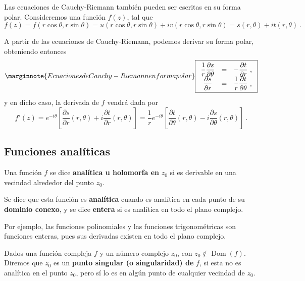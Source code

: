 Las ecuaciones de Cauchy-Riemann también pueden ser escritas en su forma polar. Consideremos una función $f(z)$, tal que
\begin{equation*}
    f(z) = f(r \cos \theta, r \sin \theta) = u(r \cos \theta, r \sin \theta) + i v(r \cos \theta, r \sin \theta) = s(r, \theta) + i t(r, \theta) \ .
\end{equation*}

A partir de las ecuaciones de Cauchy-Riemann, podemos derivar su forma polar, obteniendo entonces
\begingroup
\renewcommand*{\arraystretch}{2}
\begin{equation} \marginnote{Ecuaciones de Cauchy-Riemann en forma polar}
    \boxed{
        \begin{array}{ccc}
            \dfrac{1}{r} \dfrac{\partial s}{\partial \theta} & = & - \dfrac{\partial t}{\partial r} \ , \\
            \dfrac{\partial s}{\partial r} & = & \dfrac{1}{r} \dfrac{\partial t}{\partial \theta} \ , 
        \end{array}
    }
\end{equation}
\endgroup
y en dicho caso, la derivada de $f$ vendrá dada por
\begin{equation}
    f'(z) = e^{-i\theta} \left[ \frac{\partial s}{\partial r}(r, \theta) + i \frac{\partial t}{\partial r}(r, \theta) \right] = \frac{1}{r} e^{-i\theta} \left[ \frac{\partial t}{\partial \theta}(r, \theta) - i \frac{\partial s}{\partial \theta}(r, \theta) \right] \ .
\end{equation}

\subsection{Funciones analíticas}

\begin{defi}
    Una función $f$ se dice \textbf{analítica u holomorfa en} $z_0$ si es derivable en una vecindad alrededor del punto $z_0$. 

    Se dice que esta función es \textbf{analítica} cuando es analítica en cada punto de su \textbf{dominio conexo}, y se dice \textbf{entera} si es analítica en todo el plano complejo.
\end{defi}

Por ejemplo, las funciones polinomiales y las funciones trigonométricas son funciones enteras, pues sus derivadas existen en todo el plano complejo.

\begin{defi} 
    Dados una función compleja $f$ y un número complejo $z_0$, con $z_0 \notin \operatorname{Dom}(f)$. Diremos que $z_0$ es un \textbf{punto singular (o singularidad) de} $f$, si esta no es analítica en el punto $z_0$, pero sí lo es en algún punto de cualquier vecindad de $z_0$.
\end{defi} 

